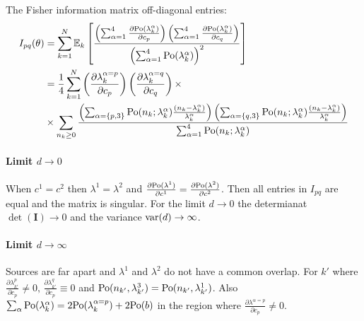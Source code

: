 The Fisher information matrix off-diagonal entries:
%
\begin{alignat*}{2}
	I_{pq}(\theta) 
	& =\sum_{k=1}^N\mathbb{E}_k\left[\frac{\left(\sum_{\alpha=1}^4\frac{\partial\mathrm{Po}(\lambda_k^\alpha)}{\partial c_p}\right)\left(\sum_{\alpha=1}^4\frac{\partial\mathrm{Po}(\lambda_k^\alpha)}{\partial c_q}\right)}{\left(\sum_{\alpha=1}^4\mathrm{Po}(\lambda_k^\alpha)\right)^2}\right]\nonumber \\
 	& =\frac{1}{4}\sum_{k=1}^N\left(\frac{\partial\lambda_k^{\alpha=p}}{\partial c_p}\right)\left(\frac{\partial\lambda_k^{\alpha=q}}{\partial c_q}\right)\times\\
	&\times\sum_{n_k\geq0}\frac{\left(\sum_{\alpha=\{p,3\}}\mathrm{Po}(n_k;\lambda_k^\alpha)\frac{(n_k-\lambda_k^\alpha)}{\lambda_k^\alpha}\right)\left(\sum_{\alpha=\{q,3\}}\mathrm{Po}(n_k;\lambda_k^\alpha)\frac{(n_k-\lambda_k^\alpha)}{\lambda_k^\alpha}\right)}{\sum_{\alpha=1}^4\mathrm{Po}(n_k;\lambda_k^\alpha)}
	\label{eq:Fisher Info Integrated Out-off diagonal entries}
\end{alignat*}

\paragraph*{Limit $d\rightarrow0$}

When $c^1=c^2$ then $\lambda^1=\lambda^2$ and $\frac{\partial\mathrm{Po}(\lambda^1)}{\partial c^1}=\frac{\partial\mathrm{Po}(\lambda^2)}{\partial c^2}$.
Then all entries in $I_{pq}$ are equal and the matrix is singular. For the limit $d\rightarrow0$ the determianat $\det(\bm{I})\rightarrow0$ and the variance $\mathrm{var}(d)\rightarrow\infty$.

\paragraph*{Limit $d\rightarrow\infty$}

Sources are far apart and $\lambda^1$ and $\lambda^2$ do not have a common overlap. For $k'$ where $\frac{\partial\lambda_{k'}^p}{\partial c_p}\neq0,\,\frac{\partial\lambda_{k'}^q}{\partial c_p}\equiv0$ and $\mathrm{Po}(n_{k'},\lambda_{k'}^3)=\mathrm{Po}(n_{k'},\lambda_{k'}^1)$. Also $\sum_\alpha\mathrm{Po}(\lambda_k^\alpha)=2\mathrm{Po}(\lambda_k^{\alpha=p})+2\mathrm{Po}(b)$ in the region where $\frac{\partial\lambda^{\alpha=p}}{\partial c_p}\neq 0$.

